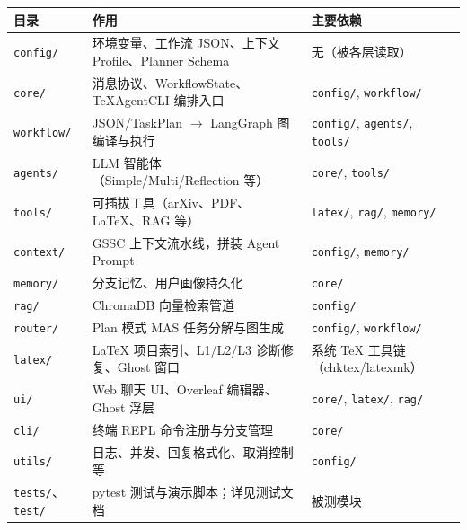 \begin{longtable}{@{}p{}p{}p{}@{}}
\toprule
\textbf{目录} & \textbf{作用} & \textbf{主要依赖} \\
\midrule
\endhead
\texttt{config/} & 环境变量、工作流 JSON、上下文 Profile、Planner Schema & 无（被各层读取） \\
\texttt{core/} & 消息协议、WorkflowState、TeXAgentCLI 编排入口 & \texttt{config/}, \texttt{workflow/} \\
\texttt{workflow/} & JSON/TaskPlan $\rightarrow$ LangGraph 图编译与执行 & \texttt{config/}, \texttt{agents/}, \texttt{tools/} \\
\texttt{agents/} & LLM 智能体（Simple/Multi/Reflection 等） & \texttt{core/}, \texttt{tools/} \\
\texttt{tools/} & 可插拔工具（arXiv、PDF、LaTeX、RAG 等） & \texttt{latex/}, \texttt{rag/}, \texttt{memory/} \\
\texttt{context/} & GSSC 上下文流水线，拼装 Agent Prompt & \texttt{config/}, \texttt{memory/} \\
\texttt{memory/} & 分支记忆、用户画像持久化 & \texttt{core/} \\
\texttt{rag/} & ChromaDB 向量检索管道 & \texttt{config/} \\
\texttt{router/} & Plan 模式 MAS 任务分解与图生成 & \texttt{config/}, \texttt{workflow/} \\
\texttt{latex/} & LaTeX 项目索引、L1/L2/L3 诊断修复、Ghost 窗口 & 系统 TeX 工具链（chktex/latexmk） \\
\texttt{ui/} & Web 聊天 UI、Overleaf 编辑器、Ghost 浮层 & \texttt{core/}, \texttt{latex/}, \texttt{rag/} \\
\texttt{cli/} & 终端 REPL 命令注册与分支管理 & \texttt{core/} \\
\texttt{utils/} & 日志、并发、回复格式化、取消控制等 & \texttt{config/} \\
\texttt{tests/}、\texttt{test/} & pytest 测试与演示脚本；详见测试文档 & 被测模块 \\
\bottomrule
\end{longtable}
